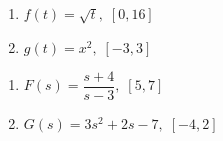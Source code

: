 \begin{multicols}{2}
\begin{enumerate}
\setcounter{enumi}{\value{HW}}

\item $f(t) = \sqrt{t}, \; [0, 16]$
\item $g(t) = x^{2}, \; [-3, 3]$

\setcounter{HW}{\value{enumi}}
\end{enumerate}
\end{multicols}

\begin{multicols}{2}
\begin{enumerate}
\setcounter{enumi}{\value{HW}}

\item $F(s) = \dfrac{s + 4}{s - 3}, \; [5, 7]$
\item $G(s) = 3s^{2} + 2s - 7, \; [-4, 2]$  \label{averagerateexerlast}

\setcounter{HW}{\value{enumi}}
\end{enumerate}
\end{multicols}



